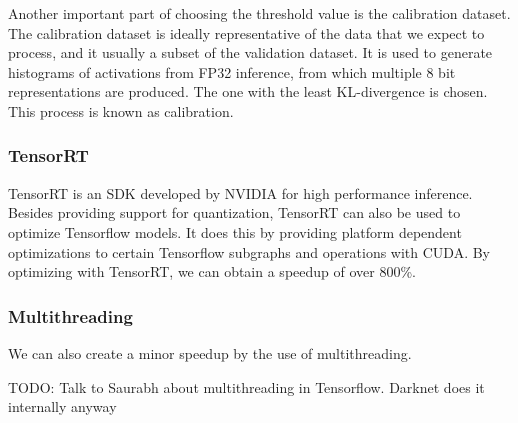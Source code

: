 \documentclass[12pt,letterpaper]{article}
\begin{document}
Another important part of choosing the threshold value is the calibration dataset. The calibration dataset is ideally representative of the data that we expect to process, and it usually a subset of the validation dataset. It is used to generate histograms of activations from FP32 inference, from which multiple 8 bit representations are produced. The one with the least KL-divergence is chosen. This process is known as calibration.

\subsubsection{TensorRT}

TensorRT is an SDK developed by NVIDIA for high performance inference. Besides providing support for quantization, TensorRT can also be used to optimize Tensorflow models. It does this by providing platform dependent optimizations to certain Tensorflow subgraphs and operations with CUDA. By optimizing with TensorRT, we can obtain a speedup of over 800\%.

\subsubsection{Multithreading}

We can also create a minor speedup by the use of multithreading.

TODO: Talk to Saurabh about multithreading in Tensorflow. Darknet does it internally anyway
\end{document}
